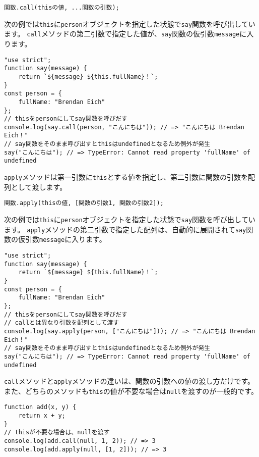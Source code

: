 \begin{lstlisting}
関数.call(thisの値, ...関数の引数);
\end{lstlisting}

次の例では\texttt{this}に\texttt{person}オブジェクトを指定した状態で\texttt{say}関数を呼び出しています。
\texttt{call}メソッドの第二引数で指定した値が、\texttt{say}関数の仮引数\texttt{message}に入ります。

\begin{lstlisting}
"use strict";
function say(message) {
    return `${message} ${this.fullName}！`;
}
const person = {
    fullName: "Brendan Eich"
};
// thisをpersonにしてsay関数を呼びだす
console.log(say.call(person, "こんにちは")); // => "こんにちは Brendan Eich！"
// say関数をそのまま呼び出すとthisはundefinedとなるため例外が発生
say("こんにちは"); // => TypeError: Cannot read property 'fullName' of undefined
\end{lstlisting}

\texttt{apply}メソッドは第一引数に\texttt{this}とする値を指定し、第二引数に関数の引数を配列として渡します。

\begin{lstlisting}
関数.apply(thisの値, [関数の引数1, 関数の引数2]);
\end{lstlisting}

次の例では\texttt{this}に\texttt{person}オブジェクトを指定した状態で\texttt{say}関数を呼び出しています。
\texttt{apply}メソッドの第二引数で指定した配列は、自動的に展開されて\texttt{say}関数の仮引数\texttt{message}に入ります。

\begin{lstlisting}
"use strict";
function say(message) {
    return `${message} ${this.fullName}！`;
}
const person = {
    fullName: "Brendan Eich"
};
// thisをpersonにしてsay関数を呼びだす
// callとは異なり引数を配列として渡す
console.log(say.apply(person, ["こんにちは"])); // => "こんにちは Brendan Eich！"
// say関数をそのまま呼び出すとthisはundefinedとなるため例外が発生
say("こんにちは"); // => TypeError: Cannot read property 'fullName' of undefined
\end{lstlisting}

\texttt{call}メソッドと\texttt{apply}メソッドの違いは、関数の引数への値の渡し方だけです。
また、どちらのメソッドも\texttt{this}の値が不要な場合は\texttt{null}を渡すのが一般的です。

\begin{lstlisting}
function add(x, y) {
    return x + y;
}
// thisが不要な場合は、nullを渡す
console.log(add.call(null, 1, 2)); // => 3
console.log(add.apply(null, [1, 2])); // => 3
\end{lstlisting}

